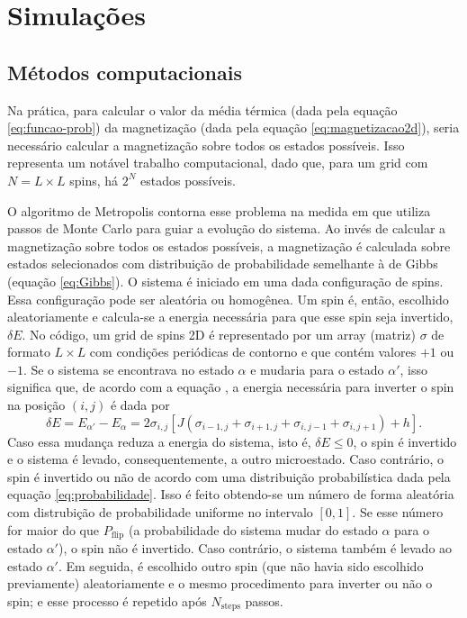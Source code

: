 \section{Simulações}

\subsection{Métodos computacionais}

Na prática, para calcular o valor da média térmica (dada pela equação \ref{eq:funcao-prob}) da magnetização (dada pela equação \ref{eq:magnetizacao2d}), seria necessário calcular a magnetização sobre todos os estados possíveis. Isso representa um notável trabalho computacional, dado que, para um grid com $N = L \times L$ spins, há $2^N$ estados possíveis.

O algoritmo de Metropolis contorna esse problema na medida em que utiliza passos de Monte Carlo para guiar a evolução do sistema. Ao invés de calcular a magnetização sobre todos os estados possíveis, a magnetização é calculada sobre estados selecionados com distribuição de probabilidade semelhante à de Gibbs (equação \ref{eq:Gibbs}). O sistema é iniciado em uma dada configuração de spins. Essa configuração pode ser aleatória ou homogênea. Um spin é, então, escolhido aleatoriamente e calcula-se a energia necessária para que esse spin seja invertido, $\delta E$. No código, um grid de spins 2D é representado por um array (matriz) $\sigma$ de formato $L \times L$ com condições periódicas de contorno e que contém valores $+1$ ou $-1$. Se o sistema se encontrava no estado $\alpha$ e mudaria para o estado $\alpha\prime$, isso significa que, de acordo com a equação \label{eq:energia}, a energia necessária para inverter o spin na posição $(i, j)$ é dada por
\begin{equation}\label{eq:deltaE}
\delta E = E_{\alpha\prime} - E_{\alpha} = 2 \sigma_{i, j} \left[J \left(\sigma _{i - 1, j} + \sigma _{i + 1, j} + \sigma _{i, j - 1} + \sigma _{i, j + 1}\right) + h\right]\text{.}
\end{equation} 
Caso essa mudança reduza a energia do sistema, isto é, $\delta E \leq 0$, o spin é invertido e o sistema é levado, consequentemente, a outro microestado. Caso contrário, o spin é invertido ou não de acordo com uma distribuição probabilística dada pela equação \ref{eq:probabilidade}. Isso é feito obtendo-se um número de forma aleatória com distrubição de probabilidade uniforme no intervalo $[0, 1]$. Se esse número for maior do que $P_{\text{flip}}$ (a probabilidade do sistema mudar do estado $\alpha$ para o estado $\alpha\prime$), o spin não é invertido. Caso contrário, o sistema também é levado ao estado $\alpha\prime$. Em seguida, é escolhido outro spin (que não havia sido escolhido previamente) aleatoriamente e o mesmo procedimento para inverter ou não o spin; e esse processo é repetido após $N_{\text{steps}}$ passos.

